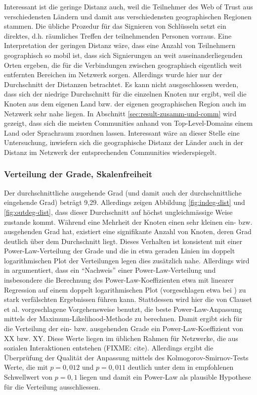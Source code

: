 Interessant ist die geringe Distanz auch, weil die Teilnehmer des Web
of Trust aus verschiedensten L\"andern und damit aus verschiedensten
geographischen Regionen stammen. Die \"ubliche Prozedur f\"ur das
Signieren von Schl\"usseln setzt ein direktes, d.h. r\"aumliches
Treffen der teilnehmenden Personen vorraus. Eine Interpretation der
geringen Distanz w\"are, dass eine Anzahl von Teilnehmern geographisch
so mobil ist, dass sich Signierungen an weit auseinanderliegenden
Orten ergeben, die f\"ur die Verbindungen zwischen geographisch
eigentlich weit entfernten Bereichen im Netzwerk sorgen. Allerdings
wurde hier nur der Durchschnitt der Distanzen betrachtet. Es kann
nicht ausgeschlossen werden, dass sich der niedrige Durchschnitt f\"ur
die einzelnen Knoten nur ergibt, weil die Knoten aus dem eigenen Land
bzw. der eigenen geographischen Region auch im Netzwerk sehr nahe
liegen. In Abschnitt \ref{sec:result-zusamm-und-comm} wird gezeigt,
dass sich die meisten Communities anhand von Top-Level-Domains einem
Land oder Sprachraum zuordnen lassen. Interessant w\"are an dieser
Stelle eine Untersuchung, inwiefern sich die geographische Distanz der
L\"ander auch in der Distanz im Netzwerk der entsprechenden
Communities wiederspiegelt.
\subsubsection{Verteilung der Grade, Skalenfreiheit}
\label{sec:verteilung-der-grade}

Der durchschnittliche ausgehende Grad (und damit auch der
durchschnittliche eingehende Grad) betr\"agt 9,29. Allerdings zeigen
Abbildung \ref{fig:indeg-dist} und \ref{fig:outdeg-dist}, dass dieser
Durchschnitt auf h\"ochst ungleichm\"assige Weise zustande
kommt. W\"ahrend eine Mehrheit der Knoten einen sehr kleinen ein-
bzw. ausgehenden Grad hat, existiert eine signifikante Anzahl von
Knoten, deren Grad deutlich \"uber dem Durchschnitt liegt. Dieses
Verhalten ist konsistent mit einer Power-Law-Verteilung der Grade und
die in etwa geraden Linien im doppelt logarithmischen Plot der
Verteilungen legen dies zus\"atzlich nahe. Allerdings wird in
\cite{Clauset2009} argumentiert, dass ein ``Nachweis'' einer
Power-Law-Verteilung und insbesondere die Berechnung des
Power-Law-Koeffizienten etwa mit linearer Regression auf einem doppelt
logarithmischen Plot (vorgeschlagen etwa bei \cite{Brinkmeier2004}) zu
stark verf\"alschten Ergebnissen f\"uhren kann. Stattdessen wird hier
die von Clauset et al. vorgeschlagene Vorgehensweise benutzt, die
beste Power-Law-Anpassung mittels der Maximum-Likelihood-Methode zu
berechnen. Damit ergibt sich f\"ur die Verteilung der ein-
bzw. ausgehenden Grade ein Power-Law-Koeffizient von XX bzw. XY. Diese
Werte liegen im \"ublichen Rahmen f\"ur Netzwerke, die aus sozialen
Interaktionen entstehen (FIXME: cite). Allerdings ergibt die
\"Uberpr\"ufung der Qualit\"at der Anpassung mittels des
Kolmogorov-Smirnov-Tests Werte, die mit $p = 0,012$ und $p = 0,011$
deutlich unter dem in \cite{Clauset2009} empfohlenen Schwellwert von
$p=0,1$ liegen und damit ein Power-Law als plausible Hypothese f\"ur
die Verteilung ausschliessen.


